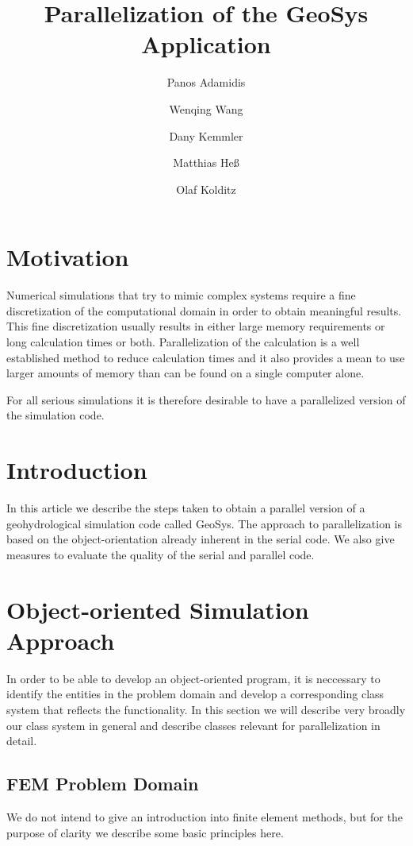 \documentclass[10pt,a4paper,twocolumn]{article}
\author{Panos Adamidis \and Wenqing Wang \and Dany Kemmler \and Matthias Heß \and Olaf Kolditz}
\title{Parallelization of the GeoSys Application}
\begin{document}
\maketitle

\section{Motivation}
Numerical simulations that try to mimic complex systems require a fine discretization of the computational domain in order to obtain meaningful results. This fine discretization usually results in either large memory requirements or long calculation times or both. 
Parallelization of the calculation is a well established method to reduce calculation times and it also provides a mean to use larger amounts of memory than can be found on a single computer alone.

For all serious simulations it is therefore desirable to have a parallelized version of the simulation code. 

\section{Introduction}

In this article we describe the steps taken to obtain a parallel version of a geohydrological simulation code called GeoSys. The approach to parallelization is based on the object-orientation already inherent in the serial code. We also give measures to evaluate the quality of the serial and parallel code.

\section{Object-oriented Simulation Approach}

In order to be able to develop an object-oriented program, it is neccessary to identify the entities in the problem domain and develop a corresponding class system that reflects the functionality. In this section we will describe very broadly our class system in general and describe classes relevant for parallelization in detail.

\subsection{FEM Problem Domain}

We do not intend to give an introduction into finite element methods, but for the purpose of clarity we describe some basic principles here.
\end{document}

